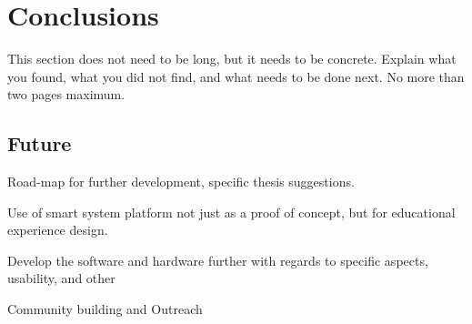 \cleardoublepage%
\chapter{Conclusions}%

This section does not need to be long, but it needs to be concrete. Explain what you found, what you did not find, and what needs to be done next. No more than two pages maximum. 

\section{\label{sec:conclusion_future}Future}
Road-map for further development, specific thesis suggestions. 

Use of smart system platform not just as a proof of concept, but for educational experience design. 

Develop the software and hardware further with regards to specific aspects, usability, and other

Community building and Outreach